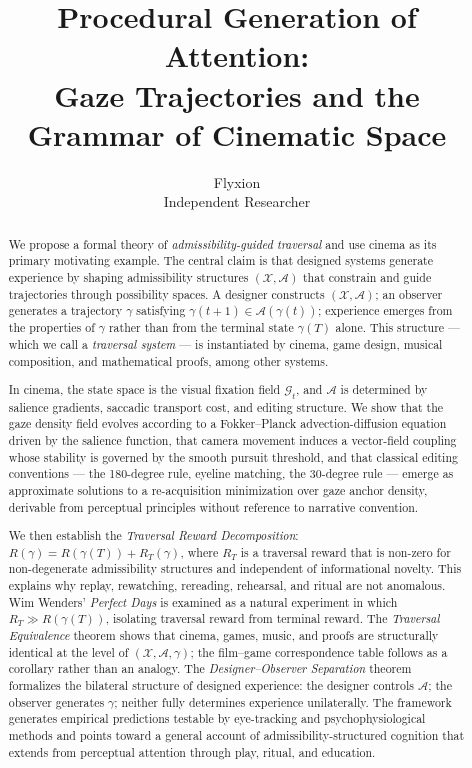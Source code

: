 \documentclass[12pt, a4paper]{article}
\title{%
  Procedural Generation of Attention:\\
  Gaze Trajectories and the Grammar of Cinematic Space%
}
\author{Flyxion\\[4pt]
  \small Independent Researcher}
\date{}
\theoremstyle{plain}
\theoremstyle{definition}
\theoremstyle{remark}
\newcommand{\X}{\mathcal{X}}
\newcommand{\A}{\mathcal{A}}
\newcommand{\G}{\mathcal{G}}
\newcommand{\traj}{\gamma}
\newcommand{\reward}{R}
\begin{document}
\maketitle

\begin{abstract}
We propose a formal theory of \emph{admissibility-guided
traversal} and use cinema as its primary motivating example.
The central claim is that designed systems generate
experience by shaping admissibility structures $(\X, \A)$
that constrain and guide trajectories through possibility
spaces. A designer constructs $(\X, \A)$; an observer
generates a trajectory $\traj$ satisfying $\traj(t+1) \in
\A(\traj(t))$; experience emerges from the properties of
$\traj$ rather than from the terminal state $\traj(T)$
alone. This structure --- which we call a \emph{traversal
system} --- is instantiated by cinema, game design, musical
composition, and mathematical proofs, among other systems.

In cinema, the state space is the visual fixation field
$\G_t$, and $\A$ is determined by salience gradients,
saccadic transport cost, and editing structure. We show that
the gaze density field evolves according to a
Fokker--Planck advection-diffusion equation driven by the
salience function, that camera movement induces a
vector-field coupling whose stability is governed by the
smooth pursuit threshold, and that classical editing
conventions --- the 180-degree rule, eyeline matching, the
30-degree rule --- emerge as approximate solutions to a
re-acquisition minimization over gaze anchor density,
derivable from perceptual principles without reference to
narrative convention.

We then establish the \emph{Traversal Reward
Decomposition}: $\reward(\traj) = \reward(\traj(T)) +
\reward_T(\traj)$, where $\reward_T$ is a traversal reward
that is non-zero for non-degenerate admissibility structures
and independent of informational novelty. This explains why
replay, rewatching, rereading, rehearsal, and ritual are not
anomalous. Wim Wenders' \textit{Perfect Days} is examined
as a natural experiment in which $\reward_T \gg
\reward(\traj(T))$, isolating traversal reward from terminal
reward. The \emph{Traversal Equivalence} theorem shows that
cinema, games, music, and proofs are structurally identical
at the level of $(\X, \A, \traj)$; the film--game
correspondence table follows as a corollary rather than an
analogy. The \emph{Designer--Observer Separation} theorem
formalizes the bilateral structure of designed experience:
the designer controls $\A$; the observer generates $\traj$;
neither fully determines experience unilaterally. The
framework generates empirical predictions testable by
eye-tracking and psychophysiological methods and points
toward a general account of admissibility-structured
cognition that extends from perceptual attention through
play, ritual, and education.
\end{abstract}
\end{document}
